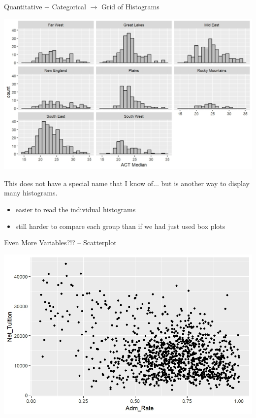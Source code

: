 \documentclass{beamer}
\begin{document}
\begin{frame}{Quantitative + Categorical $\rightarrow$ Grid of Histograms}
\begin{center}
\includegraphics[scale=0.4]{img/histograms_facetwrap.jpeg}
\end{center}

This does not have a special name that I know of... but is another way to display many histograms.
\begin{itemize}
    \item easier to read the individual histograms
    \item still harder to compare each group than if we had just used box plots
\end{itemize}
\end{frame}



\begin{frame}{Even More Variables?!? -- Scatterplot}
\begin{center}
\includegraphics[scale=.7]{img/scatter_example.jpeg}
\end{center}
\end{frame}
\end{document}
